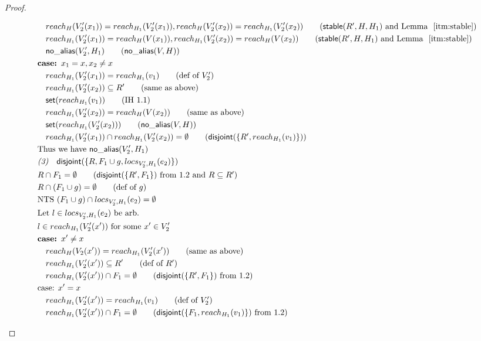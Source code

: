 \documentclass[sigconf]{acmart}
\newcommand{\ms}[1]{\ensuremath{\mathsf{#1}}}
\newcommand{\na}[1]{\mathsf{no\_alias}(#1)}
\newcommand{\stable}[1]{\mathsf{stable}(#1)}
\newcommand{\dist}[1]{\mathsf{disjoint}(#1)}
\theoremstyle{definition}
\begin{document}
\begin{proof}
\begin{description}
\begin{align*}
  &\quad reach_H(V_2'(x_1)) = reach_{H_1}(V_2'(x_1)),reach_H(V_2'(x_2)) = reach_{H_1}(V_2'(x_2)) \tag{$\stable{R',H,H_1}$ and Lemma $~\ref{itm:stable}$}\\
  &\quad reach_{H_1}(V_2'(x_1)) = reach_{H}(V(x_1)),reach_{H_1}(V_2'(x_2)) = reach_{H}(V(x_2)) \tag{$\stable{R',H,H_1}$ and Lemma $~\ref{itm:stable}$}\\
  &\quad \na{V_2',H_1} \tag{$\na{V,H}$}\\
  &\textbf{case: } x_1 = x, x_2 \ne x\\
  &\quad reach_{H_1}(V_2'(x_1)) = reach_{H_1}(v_1) \tag{def of $V_2'$}\\
  &\quad reach_{H_1}(V_2'(x_2)) \subseteq R' \tag{same as above}\\
  &\quad \ms{set}(reach_{H_1}(v_1)) \tag{IH 1.1}\\
  &\quad reach_{H_1}(V_2'(x_2)) = reach_{H}(V(x_2)) \tag{same as above}\\
  &\quad \ms{set}(reach_{H_1}(V_2'(x_2))) \tag{$\na{V,H}$}\\
  &\quad reach_{H_1}(V_2'(x_1)) \cap reach_{H_1}(V_2'(x_2)) = \emptyset \tag{$\dist{\{R',reach_{H_1}(v_1)\}}$}\\
  &\text{Thus we have } \na{V_2',H_1}\\
  &\emph{(3)}\quad \dist{\{R,F_1 \cup g,locs_{V_2',H_1}(e_2)\}}\\
  &R \cap F_1 = \emptyset \tag{$\dist{\{R', F_1\}}$ from 1.2 and $R \subseteq R'$}\\
  &R \cap (F_1 \cup g) = \emptyset \tag{def of $g$}\\
  &\text{NTS } (F_1 \cup g) \cap locs_{V_2',H_1}(e_2) = \emptyset\\
  &\text{Let } l \in locs_{V_2',H_1}(e_2) \text{ be arb.}\\
  &l \in reach_{H_1}(V_2'(x')) \text{ for some } x' \in V_2'\\
  &\textbf{case: } x' \ne x\\
  &\quad reach_H(V_2(x')) = reach_{H_1}(V_2'(x')) \tag{same as above}\\
  &\quad reach_{H_1}(V_2'(x')) \subseteq R' \tag{def of $R'$}\\
  &\quad reach_{H_1}(V_2'(x')) \cap F_1 = \emptyset \tag{$\dist{\{R', F_1\}}$ from 1.2}\\
  &\text{case: } x' = x\\
  &\quad reach_{H_1}(V_2'(x')) = reach_{H_1}(v_1) \tag{def of $V_2'$}\\
  &\quad reach_{H_1}(V_2'(x')) \cap F_1 = \emptyset \tag{$\dist{\{F_1,reach_{H_1}(v_1)\}}$ from 1.2}\\

\end{align*}
\end{description}
\end{proof}
\end{document}
